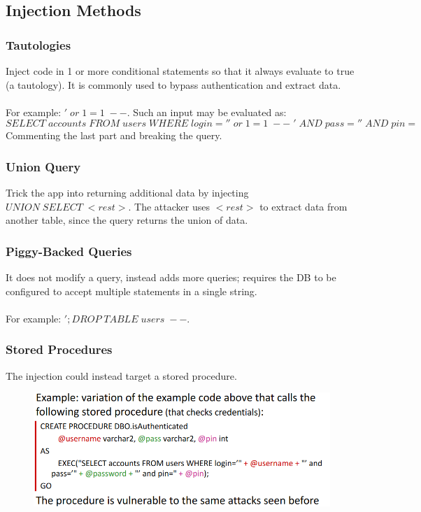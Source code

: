 \documentclass[10pt,a4paper]{report}
\begin{document}
\subsection{Injection Methods}
\subsubsection{Tautologies}
Inject code in 1 or more conditional statements so that it always evaluate to true (a tautology). It is commonly used to bypass authentication and extract data.\\
\\
For example: $' \; or \; 1=1 \; -- $. Such an input may be evaluated as: $$SELECT \; accounts \; FROM \; users \; WHERE \; login='' \; or \; 1=1 \; -- \; ' \; AND \; pass='' \; AND \; pin=$$
Commenting the last part and breaking the query.
\subsubsection{Union Query}
Trick the app into returning additional data by injecting $UNION \; SELECT  \; <rest>$. The attacker uses $<rest>$ to extract data from another table, since the query returns the union of data.
\subsubsection{Piggy-Backed Queries}
It does not modify a query, instead adds more queries; requires the DB to be configured to accept multiple statements in a single string.\\
\\
For example: $';DROP \; TABLE \; users\;--$.
\subsubsection{Stored Procedures}
The injection could instead target a stored procedure.
\begin{figure}[H]
\centering
\includegraphics[scale=0.4]{9.png}
\end{figure}
\end{document}
